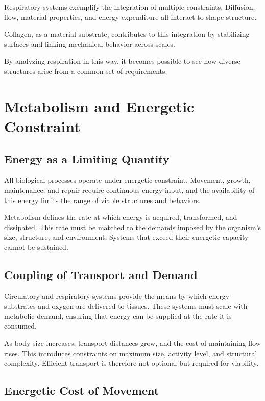 \documentclass[11pt,oneside]{book}
\begin{document}
Respiratory systems exemplify the integration of multiple constraints. Diffusion, flow, material properties, and energy expenditure all interact to shape structure.

Collagen, as a material substrate, contributes to this integration by stabilizing surfaces and linking mechanical behavior across scales.

By analyzing respiration in this way, it becomes possible to see how diverse structures arise from a common set of requirements.

\chapter{Metabolism and Energetic Constraint}

\section{Energy as a Limiting Quantity}

All biological processes operate under energetic constraint. Movement, growth, maintenance, and repair require continuous energy input, and the availability of this energy limits the range of viable structures and behaviors.

Metabolism defines the rate at which energy is acquired, transformed, and dissipated. This rate must be matched to the demands imposed by the organism’s size, structure, and environment. Systems that exceed their energetic capacity cannot be sustained.

\section{Coupling of Transport and Demand}

Circulatory and respiratory systems provide the means by which energy substrates and oxygen are delivered to tissues. These systems must scale with metabolic demand, ensuring that energy can be supplied at the rate it is consumed.

As body size increases, transport distances grow, and the cost of maintaining flow rises. This introduces constraints on maximum size, activity level, and structural complexity. Efficient transport is therefore not optional but required for viability.

\section{Energetic Cost of Movement}
\end{document}
